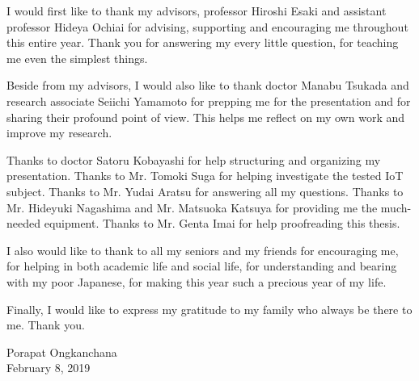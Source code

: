 I would first like to thank my advisors, professor Hiroshi Esaki and assistant professor Hideya Ochiai for advising, supporting and encouraging me throughout this entire year. Thank you for answering my every little question, for teaching me even the simplest things.  

Beside from my advisors, I would also like to thank doctor Manabu Tsukada and research associate Seiichi Yamamoto for prepping me for the presentation and for sharing their profound point of view. This helps me reflect on my own work and improve my research. 

Thanks to doctor Satoru Kobayashi for help structuring and organizing my presentation. 
Thanks to Mr. Tomoki Suga for helping investigate the tested IoT subject. 
Thanks to Mr. Yudai Aratsu for answering all my questions. 
Thanks to Mr. Hideyuki Nagashima and Mr. Matsuoka Katsuya for providing me the much-needed equipment. 
Thanks to Mr. Genta Imai for help proofreading this thesis.

I also would like to thank to all my seniors and my friends for encouraging me, for helping in both academic life and social life, for understanding and bearing with my poor Japanese, for making this year such a precious year of my life. 

Finally, I would like to express my gratitude to my family who always be there to me.  
Thank you.

\begin{flushright}
    Porapat Ongkanchana \\
    February 8, 2019
\end{flushright}
